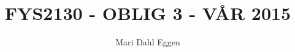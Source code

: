 \documentclass[12pt]{article}
\begin{document}
\title{FYS2130 - OBLIG 3 - VÅR 2015}
\author{Mari Dahl Eggen}
\maketitle

\newpage

\begin{flushleft}



\end{flushleft}
\end{document}
